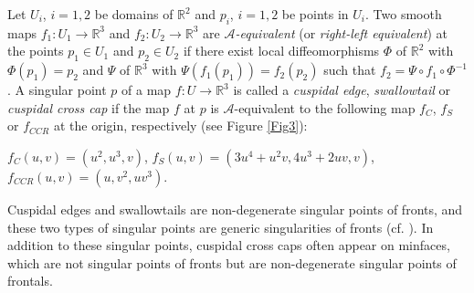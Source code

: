 \documentclass[11pt,reqno]{amsart}
\theoremstyle{plain} %
\theoremstyle{definition}
\begin{document}
Let $U_i$, $i=1, 2$ be domains of $\mathbb{R}^2$ and $p_i$, $i=1, 2$ be points in $U_i$. Two smooth maps $f_1:U_1\longrightarrow \mathbb{R}^3$ and $f_2:U_2\longrightarrow\mathbb{R}^3$ are {\it $\mathcal{A}$-equivalent} (or {\it right-left equivalent}) at the points $p_1 \in U_1$ and $p_2 \in U_2$ if there exist local diffeomorphisms $\Phi$ of $\mathbb{R}^2$ with $\Phi(p_1)=p_2$ and $\Psi$ of $\mathbb{R}^3$ with $\Psi(f_1(p_1))=f_2(p_2)$ such that $f_2 = \Psi \circ f_1\circ \Phi^{-1}$. A singular point $p$ of a map $f:U\longrightarrow \mathbb{R}^3$ is called a {\it cuspidal edge}, {\it swallowtail} or {\it cuspidal cross cap} if the map $f$ at $p$ is $\mathcal{A}$-equivalent to the following map $f_C$, $f_S$ or $f_{CCR}$ at the origin, respectively (see Figure \ref{Fig3}):
\begin{center}
$f_C(u,v)=(u^2,u^3,v)$, $f_S(u,v)=(3u^4+u^2v,4u^3+2uv,v)$, $f_{CCR}(u,v)=(u,v^2,uv^3)$.
\end{center}
Cuspidal edges and swallowtails are non-degenerate singular points of fronts, and these two types of singular points are generic singularities of fronts (cf. \cite{AGV}). In addition to these singular points, cuspidal cross caps often appear on minfaces, which are not singular points of fronts but are non-degenerate singular points of frontals.%
\vspace{-0.2cm}
\end{document}
